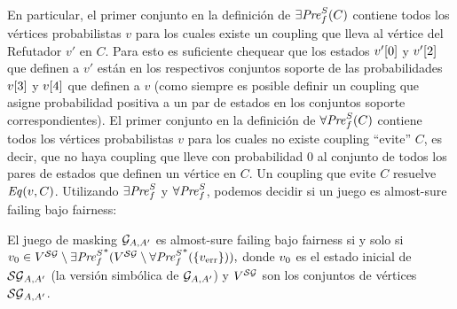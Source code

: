 %
En particular, el primer conjunto en la definición de $\SymbEFairpre(C)$
contiene todos los vértices probabilistas $v$ para los cuales existe un coupling que lleva al vértice del Refutador $v'$ en $C$.  Para esto es suficiente chequear que los estados $\pr{0}{v'}$ y $\pr{2}{v'}$ que definen a $v'$
están en los respectivos conjuntos soporte de las probabilidades
$\pr{3}{v}$ y $\pr{4}{v}$ que definen a $v$ (como
siempre es posible definir un coupling que asigne probabilidad positiva a un par de estados en los conjuntos soporte correspondientes).  El primer conjunto en la definición de $\SymbAFairpre(C)$ contiene todos los vértices probabilistas $v$ para los cuales no existe coupling ``evite'' $C$, es decir, que no haya coupling que lleve con probabilidad 0 al conjunto de todos los pares de estados que definen un vértice en $C$.  Un coupling que evite
$C$ resuelve $\Eq(v,C)$.
%
Utilizando $\SymbEFairpre$ y $\SymbAFairpre$, podemos decidir si un juego es almost-sure failing bajo fairness:

\begin{theorem}\label{theo:decide-stopping}

El juego de masking 
 $\StochG_{A,A'}$ es almost-sure failing bajo fairness  si y solo si
$
  \InitVertex \in V^\SymbG \setminus {\SymbEFairpre}^*(V^\SymbG \setminus {\SymbAFairpre}^*(\{ \ErrorSt \})),
$
donde $\InitVertex$ es el estado inicial de $\SymbG_{A,A'}$ (la versión simbólica de $\StochG_{A,A'}$) y $V^\SymbG$ son los conjuntos de vértices $\SymbG_{A,A'}$.
\end{theorem}

$
$


